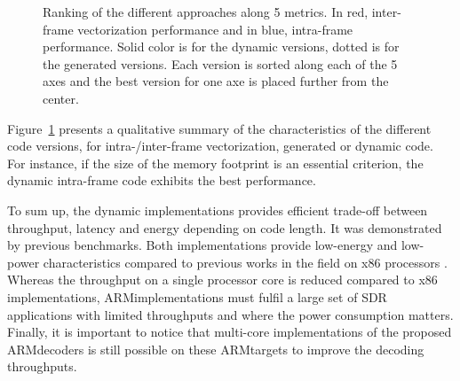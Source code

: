 \begin{figure}
  \centering
  \caption{\label{fig:polar_sc_colgate}Ranking of the different approaches along
    5 metrics. In red, inter-frame vectorization performance and in blue,
    intra-frame performance. Solid color is for the dynamic versions, dotted is
    for the generated versions. Each version is sorted along each of the 5 axes
    and the best version for one axe is placed further from the center.}
\end{figure}

Figure~\ref{fig:polar_sc_colgate} presents a qualitative summary of the
characteristics of the different code versions, for intra-/inter-frame
vectorization, generated or dynamic code. For instance, if the size of
the memory footprint is an essential criterion, the dynamic intra-frame
code exhibits the best performance.

To sum up, the dynamic implementations provides efficient trade-off between
throughput, latency and energy depending on code length. It was demonstrated by
previous benchmarks. Both implementations provide low-energy and low-power
characteristics compared to previous works in the field on x86 processors
\cite{Sarkis2014,Giard2014,Sarkis2014a,LeGal2014,LeGal2015a,Cassagne2015c}.
Whereas the throughput on a single processor core is reduced compared to x86
implementations, ARM\R implementations must fulfil a large set of SDR
applications with limited throughputs and where the power consumption matters.
Finally, it is important to notice that multi-core implementations of the
proposed ARM\R decoders is still possible on these ARM\R targets to improve the
decoding throughputs.

